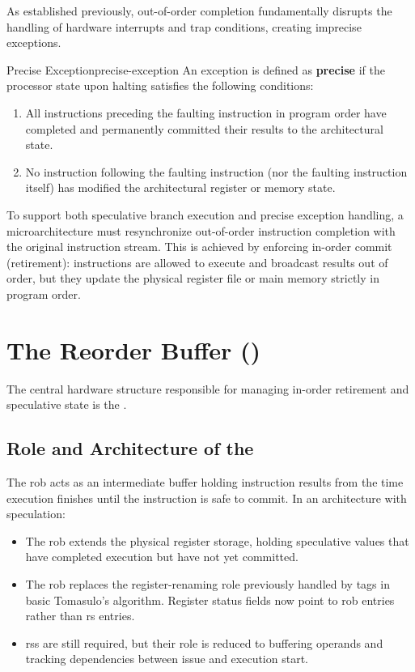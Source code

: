 As established previously, out-of-order completion fundamentally disrupts the handling of hardware interrupts and trap conditions, creating imprecise exceptions.

\begin{definition}{Precise Exception}{precise-exception}
    An exception is defined as \textbf{precise} if the processor state upon halting satisfies the following conditions:
    \begin{enumerate}
        \item All instructions preceding the faulting instruction in program order have completed and permanently committed their results to the architectural state.
        \item No instruction following the faulting instruction (nor the faulting instruction itself) has modified the architectural register or memory state.
    \end{enumerate}
\end{definition}

To support both speculative branch execution and precise exception handling, a microarchitecture must resynchronize out-of-order instruction completion with the original instruction stream. This is achieved by enforcing in-order commit (retirement): instructions are allowed to execute and broadcast results out of order, but they update the physical register file or main memory strictly in program order.

\section{The Reorder Buffer ()}

The central hardware structure responsible for managing in-order retirement and speculative state is the .

\subsection{Role and Architecture of the }
The \gls{rob} acts as an intermediate buffer holding instruction results from the time execution finishes until the instruction is safe to commit. In an architecture with speculation:
\begin{itemize}
    \item The \gls{rob} extends the physical register storage, holding speculative values that have completed execution but have not yet committed.
    \item The \gls{rob} replaces the register-renaming role previously handled by  tags in basic Tomasulo's algorithm. Register status fields now point to \gls{rob} entries rather than \gls{rs} entries.
    \item \glspl{rs} are still required, but their role is reduced to buffering operands and tracking dependencies between issue and execution start.
\end{itemize}

